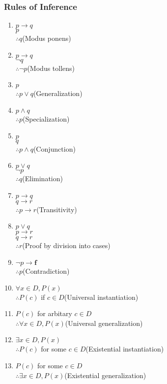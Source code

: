 \documentclass[12pt, a4paper]{article}
\begin{document}
\begin{multicols*}{3}
\subsubsection{Rules of Inference}
\begin{enumerate}[label=\roman*., parsep=6pt]
  \item $p\rightarrow q$\\
    $p$\\
    $\therefore q$\hfill(Modus ponens)
  \item $p\rightarrow q$\\
    $\neg q$\\
    $\therefore \neg p$\hfill(Modus tollens)
  \item $p$\\
    $\therefore p\lor q$\hfill(Generalization)
  \item $p\land q$\\
    $\therefore p$\hfill(Specialization)
  \item $p$\\
    $q$\\
    $\therefore p\land q$\hfill(Conjunction)
  \item $p \lor q$\\
    $\neg p$\\
    $\therefore q$\hfill(Elimination)
  \item $p \rightarrow q$\\
    $q\rightarrow r$\\
    $\therefore p\rightarrow r$\hfill(Transitivity)
  \item $p \lor q$\\
    $p \rightarrow r$\\
    $q \rightarrow r$\\
    $\therefore r$\hfill(Proof by division into cases)
  \item $\neg p \rightarrow \mathbf{f}$\\
    $\therefore p$\hfill(Contradiction)
  \item $\forall x\in D, P(x)$\\
    $\therefore P(c)$ if $c \in D$\hfill(Universal instantiation)
  \item $P(c)$ for arbitary $c \in D$\\
    $\therefore \forall x\in D, P(x)$\hfill(Universal generalization)
  \item $\exists x\in D, P(x)$\\
    $\therefore P(c)$ for some $c \in D$\hfill(Existential instantiation)
  \item $P(c)$ for some $c \in D$\\
    $\therefore \exists x\in D, P(x)$\hfill(Existential generalization)
\end{enumerate}


\end{multicols*}
\end{document}
